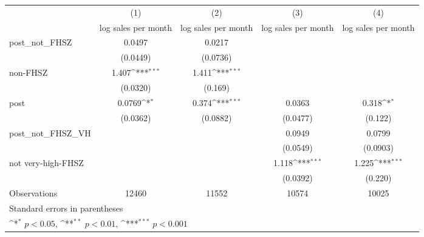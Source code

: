 {
\def\sym#1{\ifmmode^{#1}\else\(^{#1}\)\fi}
\begin{tabular}{l*{4}{c}}
\hline\hline
                    &\multicolumn{1}{c}{(1)}&\multicolumn{1}{c}{(2)}&\multicolumn{1}{c}{(3)}&\multicolumn{1}{c}{(4)}\\
                    &\multicolumn{1}{c}{log sales per month}&\multicolumn{1}{c}{log sales per month}&\multicolumn{1}{c}{log sales per month}&\multicolumn{1}{c}{log sales per month}\\
\hline
post\_not\_FHSZ       &      0.0497         &      0.0217         &                     &                     \\
                    &    (0.0449)         &    (0.0736)         &                     &                     \\
[1em]
non-FHSZ            &       1.407\sym{***}&       1.411\sym{***}&                     &                     \\
                    &    (0.0320)         &     (0.169)         &                     &                     \\
[1em]
post                &      0.0769\sym{*}  &       0.374\sym{***}&      0.0363         &       0.318\sym{*}  \\
                    &    (0.0362)         &    (0.0882)         &    (0.0477)         &     (0.122)         \\
[1em]
post\_not\_FHSZ\_VH    &                     &                     &      0.0949         &      0.0799         \\
                    &                     &                     &    (0.0549)         &    (0.0903)         \\
[1em]
not very-high-FHSZ  &                     &                     &       1.118\sym{***}&       1.225\sym{***}\\
                    &                     &                     &    (0.0392)         &     (0.220)         \\
\hline
Observations        &       12460         &       11552         &       10574         &       10025         \\
\hline\hline
\multicolumn{5}{l}{\footnotesize Standard errors in parentheses}\\
\multicolumn{5}{l}{\footnotesize \sym{*} \(p<0.05\), \sym{**} \(p<0.01\), \sym{***} \(p<0.001\)}\\
\end{tabular}
}
